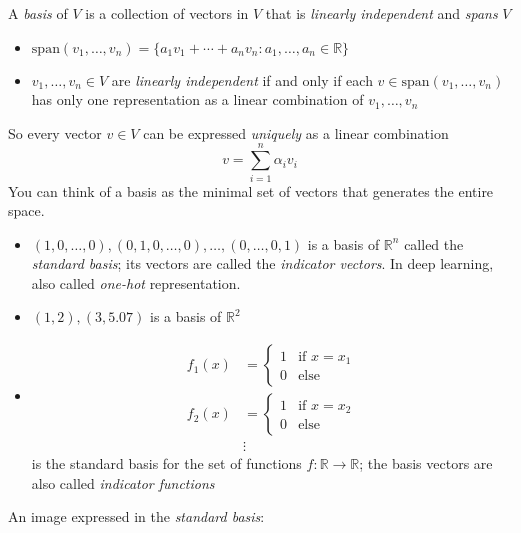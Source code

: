 
A \emph{basis} of $V$ is a collection of vectors in $V$ that is \emph{linearly independent} and \emph{spans} $V$

\medskip
\begin{itemize}
\item $\mathrm{span}(v_1,\dots,v_n) = \{ a_1 v_1 + \cdots + a_n v_n : a_1,\dots,a_n \in\mathbb{R}\}$
\medskip

\item $v_1,\dots,v_n\in V$ are \emph{linearly independent} if and only if each $v\in\mathrm{span}(v_1,\dots,v_n)$ has only one representation as a linear combination of $v_1,\dots,v_n$
\medskip
\end{itemize}

{

So every vector $v\in V$ can be expressed \emph{uniquely} as a linear combination 
\[v = \sum_{i=1}^n \alpha_i v_i\]
You can think of a basis as the minimal set of vectors that generates the entire space.
}


\begin{itemize}
\item $(1,0,\dots,0),(0,1,0,\dots,0),\dots,(0,\dots,0,1)$ is a basis of $\mathbb{R}^n$ called the \emph{standard basis}; its vectors are called the \emph{indicator vectors}. In deep learning, also called \emph{one-hot} representation.
\item $(1,2),(3,5.07)$ is a basis of $\mathbb{R}^2$
\item \begin{align*}f_1(x)&=\left\{ \begin{array}{ll}
         1 & \mbox{if $x=x_1$}\\
         0 & \mbox{else}\end{array} \right.\\
        f_2(x)&=\left\{ \begin{array}{ll}
         1 & \mbox{if $x=x_2$}\\
         0 & \mbox{else}\end{array} \right.\\ &\vdots\end{align*} is the standard basis for the set of functions $f:\mathbb{R}\to\mathbb{R}$; the basis vectors are also called \emph{indicator functions}
\end{itemize}

An image expressed in the \emph{standard basis}:

\medskip\smallskip

